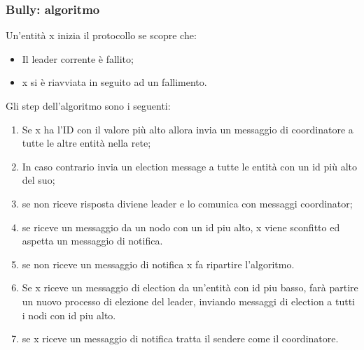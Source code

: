 \documentclass[12pt]{article}
\begin{document}
		\subsubsection{Bully: algoritmo}
			Un'entità x inizia il protocollo se scopre che: 
			\begin{itemize}
				\item Il leader corrente è fallito;
				\item x si è riavviata in seguito ad un fallimento.
			\end{itemize}
			Gli step dell'algoritmo sono i seguenti:
			\begin{enumerate}
				\item Se x ha l'ID con il valore più alto allora invia un messaggio di coordinatore a tutte le altre entità nella rete;
				\item In caso contrario invia un election message a tutte le entità con un id più alto del suo;
				\item se non riceve risposta diviene leader e lo comunica con messaggi coordinator;
				\item se riceve un messaggio da un nodo con un id piu alto, x viene sconfitto ed aspetta un messaggio di notifica.
				\item se non riceve un messaggio di notifica x fa ripartire l'algoritmo.
				\item Se x riceve un messaggio di election da un'entità con id piu basso, farà partire un nuovo processo di elezione del leader, inviando messaggi di election a tutti i nodi con id piu alto.
				\item se x riceve un messaggio di notifica tratta il sendere come il coordinatore.
			\end{enumerate}
		
\end{document}
